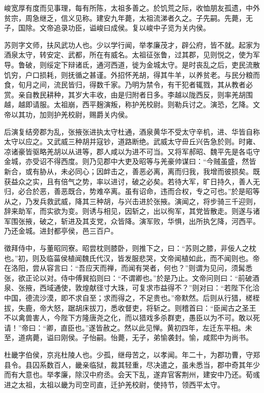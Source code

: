 \documentclass[12pt,UTF8]{ctexbook}
\begin{document}
峻宽厚有度而见事理，每有所陈，太祖多善之。於饥荒之际，收恤朋友孤遗，中外贫宗，周急继乏，信义见称。建安九年薨，太祖流涕者久之。子先嗣。先薨，无子，国除。文帝追录功臣，谥峻曰成侯。复以峻中子览为关内侯。

苏则字文师，扶风武功人也。少以学行闻，举孝廉茂才，辟公府，皆不就。起家为酒泉太守，转安定、武都，所在有威名。太祖征张鲁，过其郡，见则悦之，使为军导。鲁破，则绥定下辩诸氐，通河西道，徙为金城太守。是时丧乱之后，吏民流散饥穷，户口损耗，则抚循之甚谨。外招怀羌胡，得其牛羊，以养贫老。与民分粮而食，旬月之间，流民皆归，得数千家。乃明为禁令，有干犯者辄戮，其从教者必赏。亲自教民耕种，其岁大丰收，由是归附者日多。李越以陇西反，则率羌胡围越，越即请服。太祖崩，西平麹演叛，称护羌校尉。则勒兵讨之。演恐，乞降。文帝以其功，加则护羌校尉，赐爵关内侯。

后演复结旁郡为乱，张掖张进执太守杜通，酒泉黄华不受太守辛机，进、华皆自称太守以应之。又武威三种胡并寇钞，道路断绝。武威太守毌丘兴告急於则。时雍、凉诸豪皆驱略羌胡以从进等，郡人咸以为进不可当。又将军郝昭、魏平先是各屯守金城，亦受诏不得西度。则乃见郡中大吏及昭等与羌豪帅谋曰：“今贼虽盛，然皆新合，或有胁从，未必同心；因衅击之，善恶必离，离而归我，我增而彼损矣。既获益众之实，且有倍气之势，率以进讨，破之必矣。若待大军，旷日持久，善人无归，必合於恶，善恶既合，势难卒离。虽有诏命，违而合权，专之可也。”於是昭等从之，乃发兵救武威，降其三种胡，与兴击进於张掖。演闻之，将步骑三千迎则，辞来助军，而实欲为变。则诱与相见，因斩之，出以徇军，其党皆散走。则遂与诸军围张掖，破之，斩进及其支党，众皆降。演军败，华惧，出所执乞降，河西平。乃还金城。进封都亭侯，邑三百户。

徵拜侍中，与董昭同寮。昭尝枕则膝卧，则推下之，曰：“苏则之膝，非佞人之枕也。”初，则及临菑侯植闻魏氏代汉，皆发服悲哭，文帝闻植如此，而不闻则也。帝在洛阳，尝从容言曰：“吾应天而禅，而闻有哭者，何也？”则谓为见问，须髯悉张，欲正论以对。侍中傅巽掐则曰：“不谓卿也。”於是乃止。文帝问则曰：“前破酒泉、张掖，西域通使，敦煌献径寸大珠，可复求市益得不？”则对曰：“若陛下化洽中国，德流沙漠，即不求自至；求而得之，不足贵也。”帝默然。后则从行猎，槎桎拔，失鹿，帝大怒，踞胡床拔刀，悉收督吏，将斩之。则稽首曰：“臣闻古之圣王不以禽兽害人，今陛下方隆唐尧之化，而以猎戏多杀群吏，愚臣以为不可。敢以死请！”帝曰：“卿，直臣也。”遂皆赦之。然以此见惮。黄初四年，左迁东平相。未至，道病薨，谥曰刚侯。子怡嗣。怡薨，无子，弟愉袭封。愉，咸熙中为尚书。

杜畿字伯侯，京兆杜陵人也。少孤，继母苦之，以孝闻。年二十，为郡功曹，守郑县令。县囚系数百人，畿亲临狱，裁其轻重，尽决遣之，虽未悉当，郡中奇其年少而有大意也。举孝廉，除汉中府丞。会天下乱，遂弃官客荆州，建安中乃还。荀彧进之太祖，太祖以畿为司空司直，迁护羌校尉，使持节，领西平太守。
\end{document}
